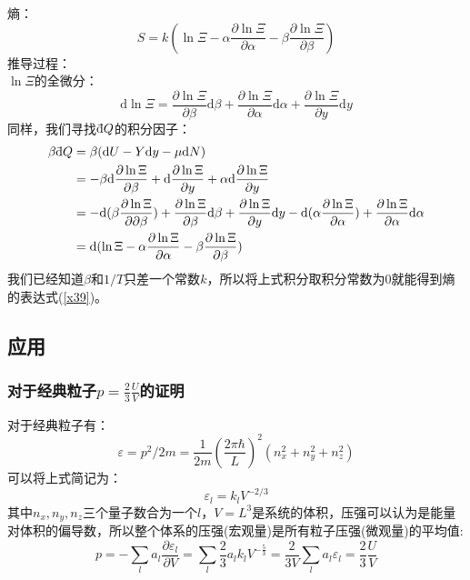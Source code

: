 \documentclass[12pt]{article}
\newcommand \dbar {{\; \bar{} \hspace{-0.3em} \mathrm d}}%
\begin{document}
熵：
\begin{equation}
	S=k(\ln \Xi-\alpha \frac{\partial \ln \Xi}{\partial \alpha}-\beta\frac{\partial \ln \Xi}{\partial \beta})
	\label{x39}
\end{equation}
推导过程：\\
$\ln \Xi$的全微分：
\begin{equation}
	\mathrm{d}\ln \Xi=\frac{\partial \ln \Xi}{\partial \beta}\mathrm{d}\beta+\frac{\partial \ln\Xi}{\partial \alpha}\mathrm{d}\alpha+\frac{\partial \ln \Xi}{\partial y}\mathrm{d}y
\end{equation}
同样，我们寻找$\dbar Q$的积分因子：
\begin{equation}
	\begin{split}
	\beta\dbar Q&=\beta(\mathrm{d}U-Y\mathrm{d}y-\mu\mathrm{d}N)\\
&=-\beta\mathrm{d}\frac{\partial \ln \Xi}{\partial \beta}+\mathrm{d}\frac{\partial \ln \Xi}{\partial y}+\alpha \mathrm{d}\frac{\partial \ln \Xi}{\partial y}\\
&=-\mathrm{d}(\beta \frac{\partial \ln \Xi}{\partial \partial \beta})+\frac{\partial \ln \Xi}{\partial \beta}\mathrm{d}\beta+\frac{\partial \ln \Xi}{\partial y}\mathrm{d}y-\mathrm{d}(\alpha \frac{\partial \ln \Xi}{\partial \alpha})+\frac{\partial \ln \Xi}{\partial \alpha}\mathrm{d}\alpha\\
&=\mathrm{d}(\ln \Xi-\alpha\frac{\partial \ln \Xi}{\partial \alpha}-\beta\frac{\partial \ln \Xi}{\partial \beta})
\end{split}
\end{equation}
我们已经知道$\beta$和$1/T$只差一个常数$k$，所以将上式积分取积分常数为0就能得到熵的表达式(\ref{x39})。
\newpage
\subsection{应用}
\subsubsection{对于经典粒子$p=\frac{2}{3}\frac{U}{V}$的证明}
\noindent
对于经典粒子有：
\begin{equation}
	\varepsilon=p^2/2m=\frac{1}{2m}(\frac{2\pi \hbar}{L})^2(n_x^2+n_y^2+n_z^2)
\end{equation}
可以将上式简记为：
\begin{equation}
	\varepsilon_l=k_lV^{-2/3}
\end{equation}
其中$n_x,n_y,n_z$三个量子数合为一个$l$，$V=L^3$是系统的体积，压强可以认为是能量对体积的偏导数，所以整个体系的压强(宏观量)是所有粒子压强(微观量)的平均值:
\begin{equation}
	p=-\sum_l a_l\frac{\partial \varepsilon_l}{\partial V}=\sum_l \frac{2}{3}a_l k_lV^{-\frac{5}{3}}= \frac{2}{3V} \sum_la_l \varepsilon_l =\frac{2}{3}\frac{U}{V}
\end{equation}
\end{document}
